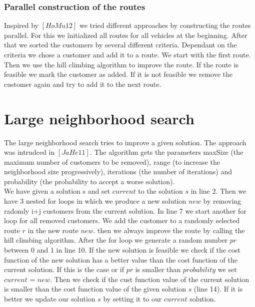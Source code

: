 \documentclass[fleqn]{scrartcl}
\begin{document}
\subsubsection{Parallel construction of the routes}
Inspired by $[HoMu 12]$ we tried different approaches by constructing the routes parallel. For this we înitialized all routes for all vehicles at the beginning. After that we sorted the customers by several different criteria. Dependant on the criteria we chose a customer and add it to a route. We start with the first route. Then we use the hill climbing algorithm to improve the route. If the route is feasible we mark the customer as added. If it is not feasible we remove the customer again and try to add it to the next route. \\




\newpage
\section{Large neighborhood search}

The large neighborhood search tries to improve a given solution. The approach was intrudced in $[JaHe 11]$. The algorithm gets the parameters maxSize (the maximum number of customers to be removed), range (to increase the neighborhood size progressively), iterations (the number of iterations) and probability (the probability to accept a worse solution). \\
We have given a solution s and set $current$ to the solution $s$ in line 2. Then we have 3 nested for loops in which we produce a new solution $new$ by removing radomly i+j customers from the current solution. In line 7 we start another for loop for all removed customers. We add the customer to a randomly selected route $r$ in the new route $new$. then we always improve the route by calling the hill climbing algorithm. After the for loop we generate a random number $pr$ between 0 and 1 in line 10. If the new solution is feasible we check if the cost function of the new solution has a better value than the cost function of the current solution. If this is the case or if $pr$ is smaller than $probability$ we set $current$ = $new$. Then we check if the cust function value of the current solution is smaller than the cost function value of the given solution $s$ (line 14). If it is better we update our solution $s$ by setting it to our $current$ solution.
 
\end{document}
